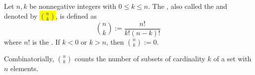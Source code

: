 \begin{definition} \label{definition:combinatorial_choose_function}
    Let $n, k$ be nonnegative integers with $0 \leq k \leq n$. The , also called the  and denoted by \hl{$\binom{n}{k}$}, is defined as
    $$\binom{n}{k} := \frac{n!}{k!(n-k)!}$$
    where $n!$ is the . If $k < 0$ or $k > n$, then $\binom{n}{k} := 0$.

    Combinatorially, $\binom{n}{k}$ counts the number of subsets of cardinality $k$ of a set with $n$ elements.
\end{definition}
